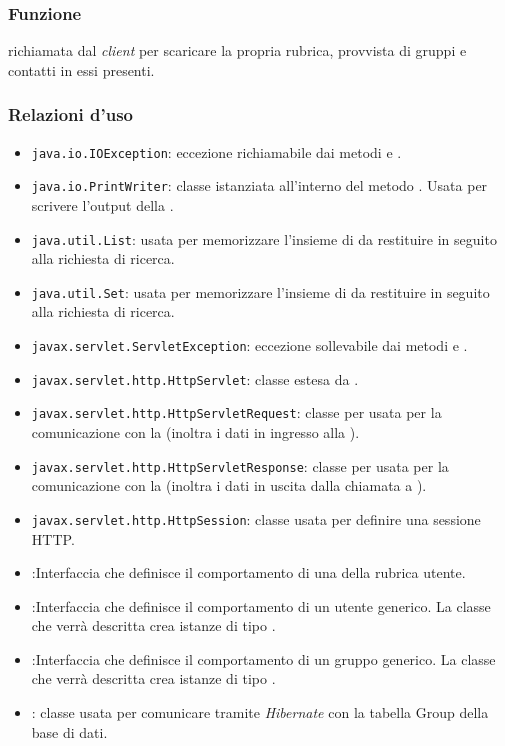 \begin{description}
\end{description}



\subsubsection*{Funzione}
 richiamata dal \textit{client} per scaricare la propria rubrica, provvista di gruppi e contatti in essi presenti.

\subsubsection*{Relazioni d'uso}

\begin{itemize}
	\item \texttt{java.io.IOException}: eccezione richiamabile dai metodi  e .
	\item \texttt{java.io.PrintWriter}: classe istanziata all'interno del metodo . Usata per scrivere l'output della .
	\item \texttt{java.util.List}: usata per memorizzare l'insieme di  da restituire in seguito alla richiesta di ricerca.
	\item \texttt{java.util.Set}: usata per memorizzare l'insieme di  da restituire in seguito alla richiesta di ricerca.
	\item \texttt{javax.servlet.ServletException}: eccezione sollevabile dai metodi  e .
	\item \texttt{javax.servlet.http.HttpServlet}: classe estesa da .
	\item \texttt{javax.servlet.http.HttpServletRequest}:  classe per usata per la comunicazione con la  (inoltra i dati in ingresso alla ).
	\item \texttt{javax.servlet.http.HttpServletResponse}: classe per usata per la comunicazione con la  (inoltra i dati in uscita dalla chiamata a ).
	\item \texttt{javax.servlet.http.HttpSession}: classe usata per definire una sessione HTTP.
	\item {}:Interfaccia che definisce il comportamento di una  della rubrica utente.
	\item {}:Interfaccia che definisce il comportamento di un utente generico. La classe che verrà descritta crea istanze di tipo .
		\item {}:Interfaccia che definisce il comportamento di un gruppo generico. La classe che verrà descritta crea istanze di tipo .
	\item {}: classe usata per comunicare tramite \textit{Hibernate} con la tabella Group della base di dati.
\end{itemize}

